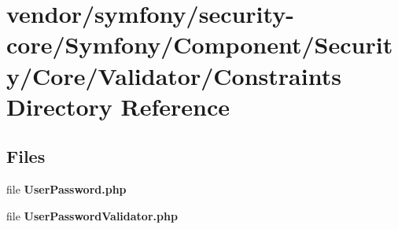 \section{vendor/symfony/security-\/core/\+Symfony/\+Component/\+Security/\+Core/\+Validator/\+Constraints Directory Reference}
\label{dir_6a13142afef3cbae6b9585a449655809}
\subsection*{Files}
\begin{DoxyCompactItemize}
\item 
file {\bf User\+Password.\+php}
\item 
file {\bf User\+Password\+Validator.\+php}
\end{DoxyCompactItemize}
